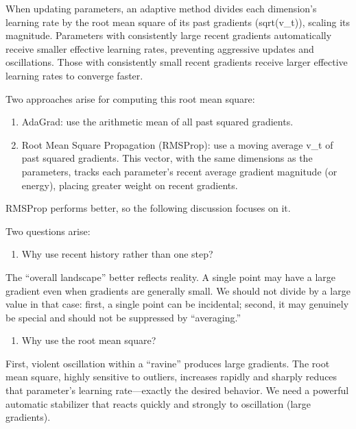 When updating parameters, an adaptive method divides each dimension's learning rate by the root mean square of its past gradients (sqrt(v\_t)), scaling its magnitude. Parameters with consistently large recent gradients automatically receive smaller effective learning rates, preventing aggressive updates and oscillations. Those with consistently small recent gradients receive larger effective learning rates to converge faster.

Two approaches arise for computing this root mean square:

\begin{enumerate}
\def\labelenumi{\arabic{enumi}.}
\item
  AdaGrad: use the arithmetic mean of all past squared gradients.
\item
  Root Mean Square Propagation (RMSProp): use a moving average v\_t of past squared gradients. This vector, with the same dimensions as the parameters, tracks each parameter's recent average gradient magnitude (or energy), placing greater weight on recent gradients.
\end{enumerate}

RMSProp performs better, so the following discussion focuses on it.

Two questions arise:

\begin{enumerate}
\def\labelenumi{\arabic{enumi}.}
\tightlist
\item
  Why use recent history rather than one step?
\end{enumerate}

The ``overall landscape'' better reflects reality. A single point may have a large gradient even when gradients are generally small. We should not divide by a large value in that case: first, a single point can be incidental; second, it may genuinely be special and should not be suppressed by ``averaging.''

\begin{enumerate}
\def\labelenumi{\arabic{enumi}.}
\setcounter{enumi}{1}
\tightlist
\item
  Why use the root mean square?
\end{enumerate}

First, violent oscillation within a ``ravine'' produces large gradients. The root mean square, highly sensitive to outliers, increases rapidly and sharply reduces that parameter's learning rate---exactly the desired behavior. We need a powerful automatic stabilizer that reacts quickly and strongly to oscillation (large gradients).

